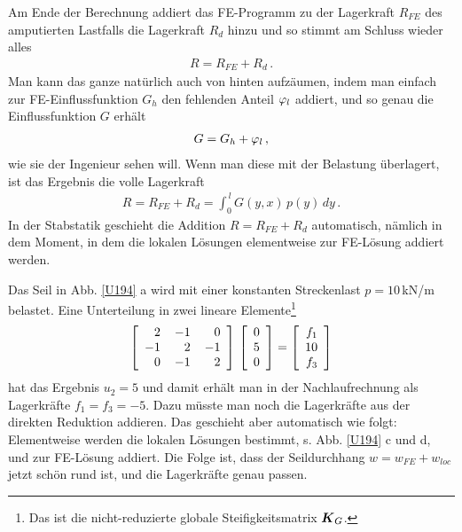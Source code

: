 {{{Am Ende der Berechnung addiert das FE-Programm zu der Lagerkraft $R_{FE}$ des \glq amputierten\grq{} Lastfalls die Lagerkraft $R_{d}$ hinzu und so stimmt am Schluss wieder alles
\begin{align}
R = R_{FE} + R_{d}\,.
\end{align}
Man kann das ganze nat\"{u}rlich auch \glq von hinten\grq{} aufz\"{a}umen, indem man einfach zur FE-Einflussfunktion $G_h$ den fehlenden Anteil $\varphi_l$ addiert, und so genau die Einflussfunktion $G$ erh\"{a}lt
\begin{align}
G = G_h + \varphi_l\,,
\end{align}
wie sie der Ingenieur sehen will. Wenn man diese mit der Belastung \"{u}berlagert, ist das Ergebnis die volle Lagerkraft
\begin{align}
R = R_{FE} + R_d = \int_0^{\,l} G(y,x)\,p(y)\,dy\,.
\end{align}
In der Stabstatik geschieht die Addition $R = R_{FE} + R_{d}$ \glq automatisch\grq{}, n\"{a}mlich in dem Moment, in dem die lokalen L\"{o}sungen elementweise zur FE-L\"{o}sung addiert werden.

Das Seil in Abb. \ref{U194} a wird mit einer konstanten Streckenlast $p = 10$\,kN/m belastet. Eine Unterteilung in zwei lineare Elemente\footnote{Das ist die nicht-reduzierte globale Steifigkeitsmatrix $\mbox{\boldmath $K$}_G$.}
\begin{align}
        \left[ \barr {r @{\hspace{4mm}}r @{\hspace{4mm}}r}
      2 & -1 & 0  \\
      -1 & 2 & -1 \\
      0 & -1 & 2  \\
      \earr \right]\,\left[ \barr {r} 0 \\ 5 \\ 0 \earr \right] = \left[ \barr {r} f_1 \\ 10 \\ f_3 \earr \right]
      \end{align}
hat das Ergebnis $u_2 = 5$ und damit erh\"{a}lt man in der Nachlaufrechnung als Lagerkr\"{a}fte $f_1 = f_3 = - 5$. Dazu m\"{u}sste man noch die Lagerkr\"{a}fte aus der direkten Reduktion addieren. Das geschieht aber automatisch wie folgt: Elementweise werden die lokalen L\"{o}sungen bestimmt, s. Abb. \ref{U194} c und d, und zur FE-L\"{o}sung addiert. Die Folge ist, dass der Seildurchhang $w = w_{FE} + w_{loc}$ jetzt sch\"{o}n rund ist, und die Lagerkr\"{a}fte genau \glq passen\grq{}.

}}}
